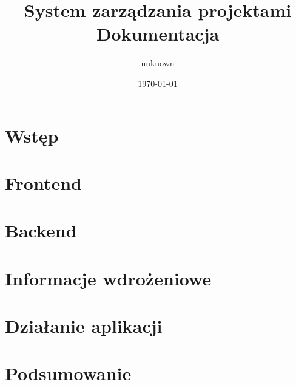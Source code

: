 \documentclass[11pt, titlepage]{article}
\title{System zarządzania projektami\\Dokumentacja}
\author{unknown}
\date{\today}
\begin{document}
\maketitle

\section{Wstęp}
\section{Frontend}
\section{Backend}
\section{Informacje wdrożeniowe}
\section{Działanie aplikacji}
\section{Podsumowanie}
\end{document}
